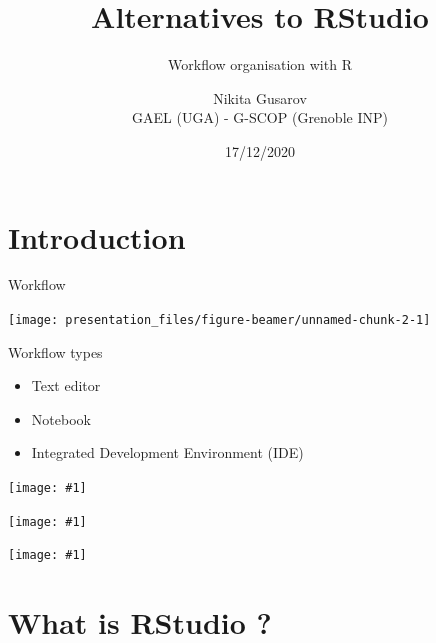 \documentclass[
  11pt,
  ignorenonframetext,
  aspectratio=169]{beamer}
\title{Alternatives to RStudio}
\subtitle{Workflow organisation with R}
\author{Nikita Gusarov\\
\scriptsize GAEL (UGA) - G-SCOP (Grenoble INP)}
\date{17/12/2020}
\providecommand{\tightlist}{%
  \setlength{\itemsep}{0pt}\setlength{\parskip}{0pt}}
\newcommand{\fullframegraphic}[1]{
  \texttt{[image: \#1]}
}
\newlength\beamerleftmargin
\begin{document}
\frame{\titlepage}

\hypertarget{introduction}{%
\section{Introduction}\label{introduction}}

\begin{frame}{Workflow}
\protect\hypertarget{workflow}{}
\begin{center}\texttt{[image: presentation\_files/figure-beamer/unnamed-chunk-2-1]} \end{center}
\end{frame}

\begin{frame}{Workflow types}
\protect\hypertarget{workflow-types}{}
\begin{itemize}
\tightlist
\item
  Text editor
\item
  Notebook
\item
  Integrated Development Environment (IDE)
\end{itemize}
\end{frame}

\begin{frame}{}
\protect\hypertarget{section}{}
\vspace*{-10.6mm}\hspace*{-\beamerleftmargin}\hspace*{-1.5mm}
\fullframegraphic{"../captures/Capture d’écran (0)"}
\end{frame}

\begin{frame}{}
\protect\hypertarget{section-1}{}
\vspace*{-10.6mm}\hspace*{-\beamerleftmargin}\hspace*{-1.5mm}
\fullframegraphic{"../captures/Capture d’écran (1)"}
\end{frame}

\begin{frame}{}
\protect\hypertarget{section-2}{}
\vspace*{-10.6mm}\hspace*{-\beamerleftmargin}\hspace*{-1.5mm}
\fullframegraphic{"../captures/Capture d’écran (3)"}
\end{frame}

\hypertarget{what-is-rstudio}{%
\section{What is RStudio ?}\label{what-is-rstudio}}
\end{document}

